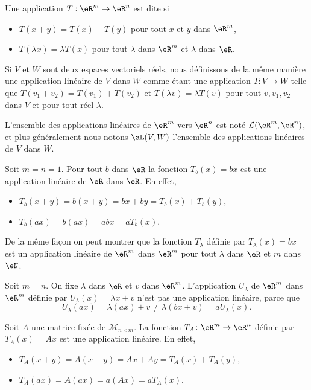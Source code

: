 \begin{definition}
	Une application $T: \eR^m\to\eR^n$ est dite  si 
\begin{itemize}
\item $T(x+y)=T(x)+T(y)$ pour tout $x$ et $y$ dans $\eR^m$,  
\item $T(\lambda x)=\lambda T(x)$ pour tout $\lambda$ dans $\eR^m$ et $\lambda$ dans $\eR$.
\end{itemize}
\end{definition}

Si $V$ et $W$ sont deux espaces vectoriels réels, nous définissons de la même manière une application linéaire de $V$ dans $W$ comme étant une application $T\colon V\to W$ telle que $T(v_1+v_2)=T(v_1)+T(v_2)$ et $T(\lambda v)=\lambda T(v)$ pour tout $v,v_1,v_2$ dans $V$ et pour tout réel $\lambda$.

L'ensemble des applications linéaires de $\eR^m$ vers $\eR^n$ est noté $\mathcal{L}(\eR^m, \eR^n)$, et plus généralement nous notons $\aL(V,W)$ l'ensemble des applications linéaires de $V$ dans $W$. 

\begin{example}
Soit $m=n=1$. Pour tout $b$ dans $\eR$ la fonction $T_b(x)= bx$ est une application linéaire de $\eR$ dans $\eR$. En effet,
\begin{itemize}
\item  $T_b(x+y)= b(x+y)= bx + by = T_b(x)+T_b(y)$,
\item $T_b(ax)=b(ax)= abx = a T_b(x)$.
\end{itemize}
De la même façon on peut montrer que la fonction $T_{\lambda}$ définie par $T_{\lambda}(x)=bx$ est un application linéaire de $\eR^m$ dans $\eR^m$ pour tout $\lambda$ dans $\eR$ et $m$ dans $\eN$.
\end{example}

\begin{example}\label{ex_affine}
	Soit $m=n$. On fixe $\lambda$ dans $\eR$ et $v$ dans $\eR^m$. L'application $U_{\lambda}$ de $\eR^m$ dans $\eR^m$ définie par $U_{\lambda}(x)=\lambda x+v$ n'est pas une application linéaire, parce que 
\[
U_{\lambda}(ax)=\lambda(ax)+v\neq \lambda(bx+v)=a U_{\lambda}(x).
\]
\end{example}

\begin{example}\label{exampleT_A}
	Soit $A$ une matrice fixée de $\mathcal{M}_{n\times m}$. La fonction $T_A\colon \eR^m\to \eR^n$ définie par $T_A(x)=Ax$ est une application linéaire. En effet, 
\begin{itemize}
\item  $T_A(x+y)= A(x+y)= Ax + Ay = T_A(x)+T_A(y)$,
\item $T_A(ax)=A(ax)= a(Ax) = a T_A(x)$.
\end{itemize}
\end{example}


